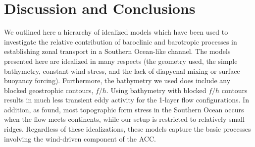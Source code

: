 \documentclass{agujournal2019}
\newcommand{\navidcomment}[1]{{\color{red} [#1]}}
\newcommand{\av}[1]	    {\left \langle {#1} \right \rangle}
\newcommand{\ws} {\mathrm{WS}}
\newcommand{\tfs} {\mathrm{TFS}}
\newcommand{\ifs} {\mathrm{IFS}}
\newcommand{\bd} {\mathrm{BD}}
\begin{document}

\section{Discussion and Conclusions}

We outlined here a hierarchy of idealized models which have been used to investigate the relative contribution of baroclinic and barotropic processes in establishing zonal transport in a Southern Ocean-like channel. The models presented here are idealized in many respects (the geometry used, the simple bathymetry, constant wind stress, and the lack of diapycnal mixing or surface buoyancy forcing). Furthermore, the bathymetry we used does include any blocked geostrophic contours, $f/h$. {\color{black}Using bathymetry with blocked $f/h$ contours results in much less transient eddy activity for the 1-layer flow configurations. In addition, as  found, most topographic form stress in the Southern Ocean occurs when the flow meets continents, while our setup is restricted to relatively small ridges.} Regardless {\color{black}of these idealizations}, these models capture the basic processes involving the wind-driven component of the ACC.
\end{document}
